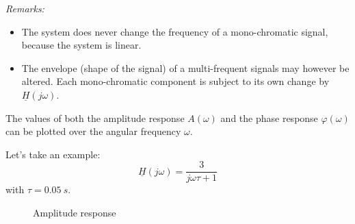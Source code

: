 \begin{refsection}
\textit{Remarks:}
\begin{itemize}
	\item The system does never change the frequency of a mono-chromatic signal, because the system is linear.
	\item The envelope (shape of the signal) of a multi-frequent signals may however be altered. Each mono-chromatic component is subject to its own change by $\underline{H}\left(j \omega\right)$.
\end{itemize}

The values of both the amplitude response $A(\omega)$ and the phase response $\varphi(\omega)$ can be plotted over the angular frequency $\omega$.

Let's take an example:
\begin{equation}
	\underline{H}\left(j \omega\right) = \frac{3}{j \omega \tau + 1}
\end{equation}
with $\tau = \SI{0.05}{s}$.

\begin{figure}[H]
	\centering
	\caption{Amplitude response}
\end{figure}


\end{refsection}
